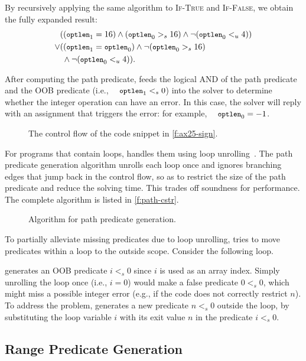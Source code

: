 By recursively applying the same algorithm to \textsc{If-True} and
\textsc{If-False}, we obtain the fully expanded result:
%
\begin{align*}
& ((\optlen_1 = 16) \land (\optlen_0 >_s 16)
    \land \neg(\optlen_0 <_u 4)) \\
\lor & ((\optlen_1 = \optlen_0) \land \neg(\optlen_0 >_s 16) \\
     & \; \land \neg(\optlen_0 <_u 4)).
\end{align*}

After computing the path predicate, \sys feeds the logical AND of the
path predicate and the OOB predicate (i.e., $\cc{optlen}_1 <_s 0$) into
the solver to determine whether the integer operation can have an error.
In this case, the solver will reply with an assignment that triggers
the error: for example, $\cc{optlen}_0 = -1$.

\begin{figure}
\centering
\resizebox{\linewidth}{!}{

}
\caption{The control flow of the code snippet in \autoref{f:ax25-sign}.}
\label{f:cfg}
\end{figure}

For programs that contain loops, \sys handles them using
loop unrolling~\cite{xie:saturn}.  The path
predicate generation algorithm unrolls each loop once and ignores
branching edges that jump back in the control flow,
so as to restrict the size of the path predicate
and reduce the solving time.
This trades off soundness for performance.
The complete algorithm is listed in \autoref{f:path-cstr}.

\begin{figure}

\caption{Algorithm for path predicate generation.}
\label{f:path-cstr}
\end{figure}

To partially alleviate missing predicates due to loop unrolling,
\sys tries to move predicates within a loop to the outside scope.
Consider the following loop.

\sys generates an OOB predicate $i <_s 0$ since $i$ is used
as an array index.  Simply unrolling the loop once (i.e., $i = 0$)
would make a false predicate $0 <_s 0$, which might miss a possible
integer error (e.g., if the code does not correctly restrict $n$).
To address the problem, \sys generates a new predicate $n <_s 0$
outside the loop, by substituting the loop variable $i$ with its
exit value $n$ in the predicate $i <_s 0$.


\subsection{Range Predicate Generation}
\label{s:gen:range}

